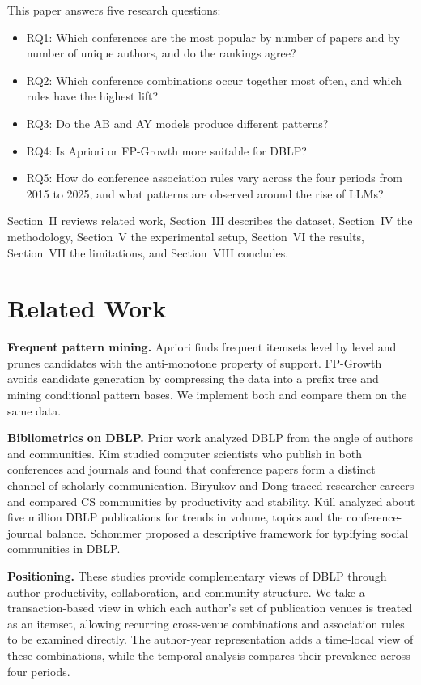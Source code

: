 \documentclass[conference]{IEEEtran}
\begin{document}
This paper answers five research questions:
\begin{itemize}
\item RQ1: Which conferences are the most popular by number of papers and by number of unique authors, and do the rankings agree?
\item RQ2: Which conference combinations occur together most often, and which rules have the highest lift?
\item RQ3: Do the AB and AY models produce different patterns?
\item RQ4: Is Apriori or FP-Growth more suitable for DBLP?
\item RQ5: How do conference association rules vary across the four periods from 2015 to 2025, and what patterns are observed around the rise of LLMs?
\end{itemize}

Section~II reviews related work, Section~III describes the dataset, Section~IV the methodology, Section~V the experimental setup, Section~VI the results, Section~VII the limitations, and Section~VIII concludes.

\section{Related Work}
\textbf{Frequent pattern mining.} Apriori \cite{apriori} finds frequent itemsets level by level and prunes candidates with the anti-monotone property of support. FP-Growth \cite{fpgrowth} avoids candidate generation by compressing the data into a prefix tree and mining conditional pattern bases. We implement both and compare them on the same data.

\textbf{Bibliometrics on DBLP.} Prior work analyzed DBLP from the angle of authors and communities. Kim \cite{kim} studied computer scientists who publish in both conferences and journals and found that conference papers form a distinct channel of scholarly communication. Biryukov and Dong \cite{biryukov} traced researcher careers and compared CS communities by productivity and stability. K\"ull \cite{kull} analyzed about five million DBLP publications for trends in volume, topics and the conference-journal balance. Schommer \cite{schommer} proposed a descriptive framework for typifying social communities in DBLP.

\textbf{Positioning.} These studies provide complementary views of DBLP through author productivity, collaboration, and community structure. We take a transaction-based view in which each author's set of publication venues is treated as an itemset, allowing recurring cross-venue combinations and association rules to be examined directly. The author-year representation adds a time-local view of these combinations, while the temporal analysis compares their prevalence across four periods.
\end{document}
